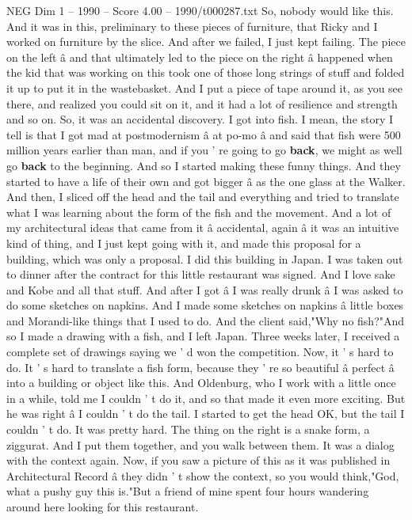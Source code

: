 \begin{textsample}{NEG Dim 1 – 1990 – Score 4.00 – 1990/t000287.txt}
So, nobody would like this.
And it was in this, preliminary to these pieces of furniture, that Ricky and I worked on furniture by the slice.
And after we failed, I just kept failing.
The piece on the left â and that ultimately led to the piece on the right â happened when the kid that was working on this took one of those long strings of stuff and folded it up to put it in the wastebasket.
And I put a piece of tape around it, as you see there, and realized you could sit on it, and it had a lot of resilience and strength and so on.
So, it was an accidental discovery.
I got into fish.
I mean, the story I tell is that I got mad at postmodernism â at po-mo â and said that fish were 500 million years earlier than man, and if you ' re going to go \textbf{back}, we might as well go \textbf{back} to the beginning.
And so I started making these funny things.
And they started to have a life of their own and got bigger â as the one glass at the Walker.
And then, I sliced off the head and the tail and everything and tried to translate what I was learning about the form of the fish and the movement.
And a lot of my architectural ideas that came from it â accidental, again â it was an intuitive kind of thing, and I just kept going with it, and made this proposal for a building, which was only a proposal.
I did this building in Japan.
I was taken out to dinner after the contract for this little restaurant was signed.
And I love sake and Kobe and all that stuff.
And after I got â I was really drunk â I was asked to do some sketches on napkins.
And I made some sketches on napkins â little boxes and Morandi-like things that I used to do.
And the client said,"Why no fish?"And so I made a drawing with a fish, and I left Japan.
Three weeks later, I received a complete set of drawings saying we ' d won the competition.
Now, it ' s hard to do.
It ' s hard to translate a fish form, because they ' re so beautiful â perfect â into a building or object like this.
And Oldenburg, who I work with a little once in a while, told me I couldn ' t do it, and so that made it even more exciting.
But he was right â I couldn ' t do the tail.
I started to get the head OK, but the tail I couldn ' t do.
It was pretty hard.
The thing on the right is a snake form, a ziggurat.
And I put them together, and you walk between them.
It was a dialog with the context again.
Now, if you saw a picture of this as it was published in Architectural Record â they didn ' t show the context, so you would think,"God, what a pushy guy this is."But a friend of mine spent four hours wandering around here looking for this restaurant.

\end{textsample}
